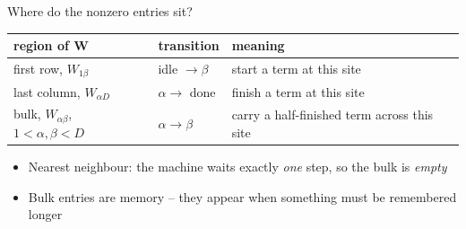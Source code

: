 \documentclass[aspectratio=169,10pt]{beamer}
\newcommand{\bmat}[1]{\bm{#1}}
\begin{document}
\begin{frame}{Where do the nonzero entries sit?}
  \begin{center}\small
  \begin{tabular}{@{}lll@{}}\toprule
  region of $\bmat W$ & transition & meaning\\\midrule
  first row, $W_{1\beta}$ & idle $\to\beta$ & \alert{start} a term at this site\\
  last column, $W_{\alpha D}$ & $\alpha\to$ done & \alert{finish} a term at this site\\
  bulk, $W_{\alpha\beta}$, $1<\alpha,\beta<D$ & $\alpha\to\beta$ & \alert{carry} a half-finished term across this site\\\bottomrule
  \end{tabular}
  \end{center}
  \vspace{0.5em}
  \begin{itemize}
    \item Nearest neighbour: the machine waits exactly \emph{one} step, so the bulk is \emph{empty}
    \item \alert{Bulk entries are memory} -- they appear when something must be remembered longer
  \end{itemize}
\end{frame}
\end{document}
